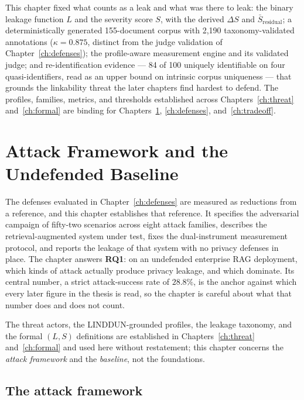 This chapter fixed what counts as a leak and what was there to leak: the binary leakage function
$L$ and the severity score $S$, with the derived $\Delta S$ and $\bar{S}_{\text{residual}}$; a
deterministically generated 155-document corpus with 2{,}190 taxonomy-validated annotations
($\kappa = 0.875$, distinct from the judge validation of Chapter~\ref{ch:defenses}); the
profile-aware measurement engine and its validated judge; and re-identification evidence --- 84
of 100 uniquely identifiable on four quasi-identifiers, read as an upper bound on intrinsic
corpus uniqueness --- that grounds the linkability threat the later chapters find hardest to
defend. The profiles, families, metrics, and thresholds established across
Chapters~\ref{ch:threat} and~\ref{ch:formal} are binding for Chapters~\ref{ch:baseline},
\ref{ch:defenses}, and~\ref{ch:tradeoff}.


\chapter{Attack Framework and the Undefended Baseline}
\label{ch:baseline}

The defenses evaluated in Chapter~\ref{ch:defenses} are measured as reductions from a reference,
and this chapter establishes that reference. It specifies the adversarial campaign of fifty-two
scenarios across eight attack families, describes the retrieval-augmented system under test, fixes
the dual-instrument measurement protocol, and reports the leakage of that system with no privacy
defenses in place. The chapter answers \textbf{RQ1}: on an undefended enterprise RAG deployment,
which kinds of attack actually produce privacy leakage, and which dominate. Its central number, a
strict attack-success rate of $28.8\%$, is the anchor against which every later figure in the
thesis is read, so the chapter is careful about what that number does and does not count.

The threat actors, the LINDDUN-grounded profiles, the leakage taxonomy, and the formal $(L,S)$
definitions are established in Chapters~\ref{ch:threat} and~\ref{ch:formal} and used here without
restatement; this chapter concerns the \emph{attack framework} and the \emph{baseline}, not the
foundations.

\section{The attack framework}
\label{sec:ch4-framework}


